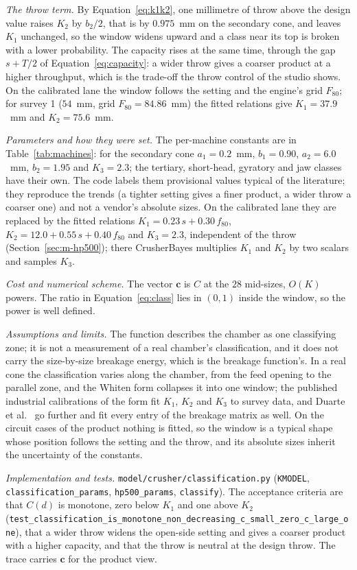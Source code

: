 \emph{The throw term.} By Equation~\eqref{eq:k1k2}, one millimetre of throw above the design value raises $K_2$ by $b_2/2$, that is by
$0.975$~mm on the secondary cone, and leaves $K_1$ unchanged, so the window widens upward and a class near its top is broken with a lower
probability. The capacity rises at the same time, through the gap $s+T/2$ of Equation~\eqref{eq:capacity}: a wider throw gives a coarser
product at a higher throughput, which is the trade-off the throw control of the studio shows. On the calibrated lane the window follows the
setting and the engine's grid $F_{80}$; for survey 1 ($54$~mm, grid $F_{80}=84.86$~mm) the fitted relations give $K_1=37.9$~mm and
$K_2=75.6$~mm.

\emph{Parameters and how they were set.} The per-machine constants are in Table~\ref{tab:machines}: for the secondary cone $a_1=0.2$~mm,
$b_1=0.90$, $a_2=6.0$~mm, $b_2=1.95$ and $K_3=2.3$; the tertiary, short-head, gyratory and jaw classes have their own. The code labels
them provisional values typical of the literature; they reproduce the trends (a tighter setting gives a finer product, a wider throw
a coarser one) and not a vendor's absolute sizes. On the calibrated lane they are replaced by the fitted relations
$K_1=0.23\,s+0.30\,f_{80}$, $K_2=12.0+0.55\,s+0.40\,f_{80}$ and $K_3=2.3$, independent of the throw (Section~\ref{sec:m-hp500}); there
CrusherBayes multiplies $K_1$ and $K_2$ by two scalars and samples $K_3$.

\emph{Cost and numerical scheme.} The vector $\mathbf c$ is $C$ at the $28$ mid-sizes, $O(K)$ powers. The ratio in
Equation~\eqref{eq:class} lies in $(0,1)$ inside the window, so the power is well defined.

\emph{Assumptions and limits.} The function describes the chamber as one classifying zone; it is not a measurement of a real chamber's
classification, and it does not carry the size-by-size breakage energy, which is the breakage function's. In a real cone the classification
varies along the chamber, from the feed opening to the parallel zone, and the Whiten form collapses it into one window; the published
industrial calibrations of the form fit $K_1$, $K_2$ and $K_3$ to survey data, and Duarte et al.~\cite{duarte2021} go further and fit every
entry of the breakage matrix as well. On the circuit cases of the product nothing is fitted, so the window is a typical shape whose position
follows the setting and the throw, and its absolute sizes inherit the uncertainty of the constants.

\emph{Implementation and tests.} \texttt{model/\allowbreak{}crusher/\allowbreak{}classification.py} (\texttt{KMODEL}, \texttt{classification\_params},
\texttt{hp500\_params}, \texttt{classify}). The acceptance criteria are that $C(d)$ is monotone, zero below $K_1$ and one above $K_2$
(\texttt{test\_classification\_is\_monotone\_non\_decreasing\_c\_small\_zero\_c\_large\_one}), that a wider throw widens the open-side
setting and gives a coarser product with a higher capacity, and that the throw is neutral at the design throw. The trace carries
$\mathbf c$ for the product view.


